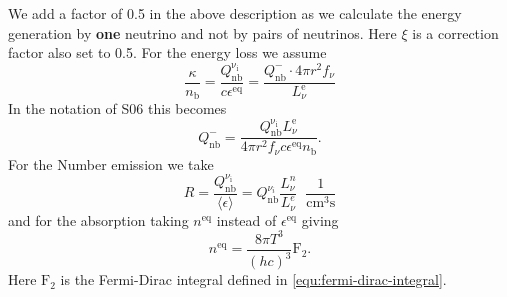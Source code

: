 \documentclass[fleqn,usenatbib]{mnras}
\begin{document}
\begin{appendices}
We add a factor of 0.5 in the above description as we calculate the energy generation by \textbf{one} neutrino and not by pairs of neutrinos. Here $\xi$ is a correction factor also set to 0.5.
For the energy loss we assume
\begin{equation}
    \frac{\kappa}{n_{\mathrm{b}}} = \frac{Q_{\mathrm{nb}}^{\mathrm{\nu_i}}}{c \epsilon^{\mathrm{eq}}} = \frac{Q_{\mathrm{nb}}^{-}\cdot 4\pi r^2 f_{\nu}}{L_{\nu}^{\mathrm{e}}}
\end{equation}
In the notation of S06 this becomes
\begin{equation}
    Q_{\mathrm{nb}}^{-} = \frac{Q_{\mathrm{nb}}^{\mathrm{\nu_i}} L_{\nu}^{\mathrm{e}} }{4\pi r^2 f_{\nu} c \epsilon^{\mathrm{eq}} n_{\mathrm{b}}}.
\end{equation}
For the Number emission we take
\begin{equation}
    R=\frac{Q_{\mathrm{nb}}^{\nu_{\mathrm{i}}}}{\langle \epsilon \rangle} = Q_{\mathrm{nb}}^{\nu_i} \frac{L_{\nu}^n }{L_{\nu}^e }\;\; \mathrm{\frac{1}{cm^3s}}
\end{equation}
and for the absorption taking $ n^{\mathrm{eq}}$ instead of $ \epsilon^{\mathrm{eq}} $ giving
\begin{equation}
    n^{\mathrm{eq}} = \frac{8\pi T^3}{(hc)^3}\mathrm{F}_2.
\end{equation}
Here $\mathrm{F}_2$ is the Fermi-Dirac integral defined in \autoref{equ:fermi-dirac-integral}.

\end{appendices}

\end{document}
